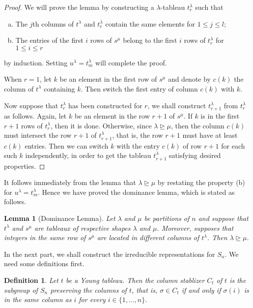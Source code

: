 \documentclass{assignment}[2019/10/15]
\theoremstyle{plain}
\newtheorem{definition}[theorem]{Definition}
\newtheorem{lemma}[theorem]{Lemma}
\begin{document}
    \begin{proof}
        We will prove the lemma by constructing a $\lambda$-tableau $t_r^\lambda$ such that
        \begin{enumerate}[(a)]
            \item The $j$th columns of $t^\lambda$ and $t_r^\lambda$ contain the same elements for $1\leq j\leq l$;
            \item The entries of the first $i$ rows of $s^\mu$ belong to the first $i$ rows of $t_r^\lambda$ for $1\leq i \leq r$
        \end{enumerate}
        by induction. Setting $u^\lambda = t_m^\lambda$ will complete the proof.

        When $r=1$, let $k$ be an element in the first row of $s^\mu$ and denote by $c(k)$ the column of $t^\lambda$ containing $k$. Then switch the first entry of column $c(k)$ with $k$.

        Now suppose that $t_r^\lambda$ has been constructed for $r$, we shall construct $t_{r+1}^\lambda$ from $t_r^\lambda$ as follows. Again, let $k$ be an element in the row $r+1$ of $s^\mu$. If $k$ is in the first $r+1$ rows of $t_r^\lambda$, then it is done. Otherwise, since $\lambda\unrhd\mu$, then the column $c(k)$ must intersect the row $r+1$ of $t_{r+1}^\lambda$, that is, the row $r+1$ must have at least $c(k)$ entries. Then we can switch $k$ with the entry $c(k)$ of row $r+1$ for each such $k$ independently, in order to get the tableau $t_{r+1}^\lambda$ satisfying desired properties.
    \end{proof}

    It follows immediately from the lemma that $\lambda\unrhd\mu$ by restating the property (b) for $u^\lambda = t_m^\lambda$. Hence we have proved the dominance lemma, which is stated as follows.

    \begin{lemma}[Dominance Lemma]\label{lem: dom}
        Let $\lambda$ and $\mu$ be partitions of $n$ and suppose that $t^\lambda$ and $s^\mu$ are tableaux of respective shapes $\lambda$ and $\mu$. Moreover, supposes that integers in the same row of $s^\mu$ are located in different columns of $t^\lambda$. Then $\lambda\unrhd\mu$.
    \end{lemma}

    In the next part, we shall construct the irreducible representations for $S_n$. We need some definitions first.

    \begin{definition}
        Let $t$ be a Young tableau. Then the \emph{column stablizer} $C_t$ of $t$ is the subgroup of $S_n$ preserving the columns of $t$, that is, $\sigma\in C_t$ if and only if $\sigma(i)$ is in the same column as $i$ for every $i\in \{1, \dotsc, n\}$.
    \end{definition}
\end{document}
